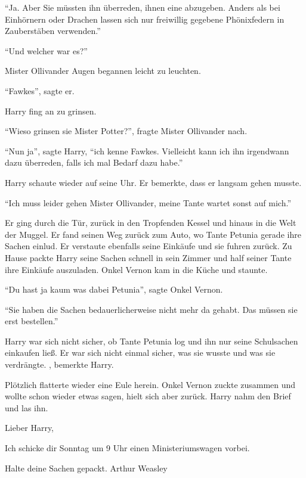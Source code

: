 \enquote{Ja. Aber Sie müssten ihn überreden, ihnen eine abzugeben. Anders als bei Einhörnern oder Drachen lassen sich nur freiwillig gegebene Phönixfedern in Zauberstäben verwenden.}

\enquote{Und welcher war es?}

Mister Ollivander Augen begannen leicht zu leuchten.

\enquote{Fawkes}, sagte er.

Harry fing an zu grinsen.

\enquote{Wieso grinsen sie Mister Potter?}, fragte Mister Ollivander nach.

\enquote{Nun ja}, sagte Harry, \enquote{ich kenne Fawkes. Vielleicht kann ich ihn irgendwann dazu überreden, falls ich mal Bedarf dazu habe.}

Harry schaute wieder auf seine Uhr. Er bemerkte, dass er langsam gehen musste.

\enquote{Ich muss leider gehen Mister Ollivander, meine Tante wartet sonst auf mich.}

Er ging durch die Tür, zurück in den Tropfenden Kessel und hinaus in die Welt der Muggel. Er fand seinen Weg zurück zum Auto, wo Tante Petunia gerade ihre Sachen einlud. Er verstaute ebenfalls seine Einkäufe und sie fuhren zurück. Zu Hause packte Harry seine Sachen schnell in sein Zimmer und half seiner Tante ihre Einkäufe auszuladen. Onkel Vernon kam in die Küche und staunte.

\enquote{Du hast ja kaum was dabei Petunia}, sagte Onkel Vernon.

\enquote{Sie haben die Sachen bedauerlicherweise nicht mehr da gehabt. Das müssen sie erst bestellen.}

Harry war sich nicht sicher, ob Tante Petunia log und ihn nur seine Schulsachen einkaufen ließ. Er war sich nicht einmal sicher, was sie wusste und was sie verdrängte. , bemerkte Harry. 

Plötzlich flatterte wieder eine Eule herein. Onkel Vernon zuckte zusammen und wollte schon wieder etwas sagen, hielt sich aber zurück. Harry nahm den Brief und las ihn.

\begin{brief}
Lieber Harry,

Ich schicke dir Sonntag um 9 Uhr einen Ministeriumswagen vorbei.

Halte deine Sachen gepackt.
\signumspace
Arthur Weasley
\end{brief}

